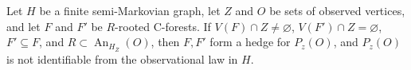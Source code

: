 Let \(H\) be a finite semi-Markovian graph, let \(Z\) and \(O\) be sets of observed vertices, and let \(F\) and \(F'\) be \(R\)-rooted C-forests. If \(V(F)\cap Z\ne\varnothing\), \(V(F')\cap Z=\varnothing\), \(F'\subseteq F\), and \(R\subset\operatorname{An}_{H_{\overline Z}}(O)\), then \(F,F'\) form a hedge for \(P_z(O)\), and \(P_z(O)\) is not identifiable from the observational law in \(H\).